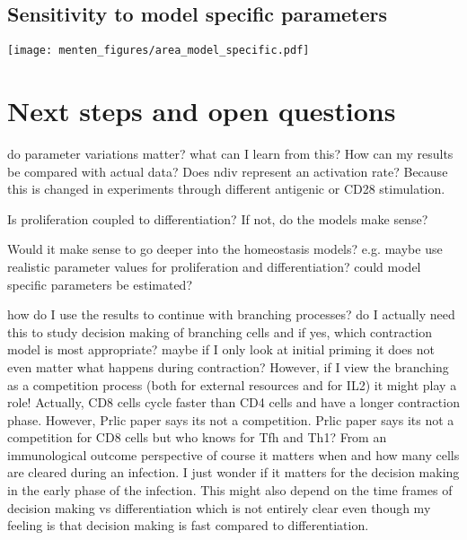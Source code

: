 \documentclass[12pt,a4paper]{article}
\begin{document}
\subsection*{Sensitivity to model specific parameters}
\texttt{[image: menten\_figures/area\_model\_specific.pdf]}

\section*{Next steps and open questions}
do parameter variations matter? what can I learn from this? How can my results be compared with actual data? Does ndiv represent an activation rate? Because this is changed in experiments through different antigenic or CD28 stimulation. 

Is proliferation coupled to differentiation? If not, do the models make sense?

Would it make sense to go deeper into the homeostasis models? e.g. maybe use realistic parameter values for proliferation and differentiation? could model specific parameters be estimated?

how do I use the results to continue with branching processes?
do I actually need this to study decision making of branching cells and if yes, which contraction model is most appropriate? maybe if I only look at initial priming it does not even matter what happens during contraction? However, if I view the branching as a competition process (both for external resources and for IL2) it might play a role! Actually, CD8 cells cycle faster than CD4 cells and have a longer contraction phase. However, Prlic paper says its not a competition. Prlic paper says its not a competition for CD8 cells but who knows for Tfh and Th1? From an immunological outcome perspective of course it matters when and how many cells are cleared during an infection. I just wonder if it matters for the decision making in the early phase of the infection. This might also depend on the time frames of decision making vs differentiation which is not entirely clear even though my feeling is that decision making is fast compared to differentiation.
\end{document}
